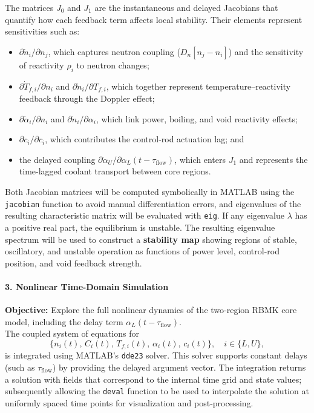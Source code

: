 \documentclass[11pt]{article}
\begin{document}
The matrices $J_0$ and $J_1$ are the instantaneous and delayed Jacobians that quantify how each feedback term affects local stability. Their elements represent sensitivities such as:
\begin{itemize}
    \item $\partial \dot{n}_i / \partial n_j$, which captures neutron coupling ($D_n[n_j - n_i]$) and the sensitivity of reactivity $\rho_i$ to neutron changes;
    \item $\partial \dot{T}_{f,i} / \partial n_i$ and $\partial \dot{n}_i / \partial T_{f,i}$, which together represent temperature--reactivity feedback through the Doppler effect;
    \item $\partial \dot{\alpha}_i / \partial n_i$ and $\partial \dot{n}_i / \partial \alpha_i$, which link power, boiling, and void reactivity effects;
    \item $\partial \dot{c}_i / \partial c_i$, which contributes the control-rod actuation lag; and
    \item the delayed coupling $\partial \dot{\alpha}_U / \partial \alpha_L(t-\tau_{\mathrm{flow}})$, which enters $J_1$ and represents the time-lagged coolant transport between core regions.
\end{itemize}

Both Jacobian matrices will be computed symbolically in MATLAB using the \texttt{jacobian} function to avoid manual differentiation errors, and eigenvalues of the resulting characteristic matrix will be evaluated with \texttt{eig}. If any eigenvalue $\lambda$ has a positive real part, the equilibrium is unstable. The resulting eigenvalue spectrum will be used to construct a \textbf{stability map} showing regions of stable, oscillatory, and unstable operation as functions of power level, control-rod position, and void feedback strength.

\paragraph{3. Nonlinear Time-Domain Simulation}
\textbf{Objective:} Explore the full nonlinear dynamics of the two-region RBMK core model, including the delay term \(\alpha_L(t - \tau_{\mathrm{flow}})\).\\

The coupled system of equations for 
\[
\{n_i(t),\,C_i(t),\,T_{f,i}(t),\,\alpha_i(t),\,c_i(t)\}, \quad i\in\{L,U\},
\]
is integrated using MATLAB’s \texttt{dde23} solver. This solver supports constant delays (such as \(\tau_{\mathrm{flow}}\)) by providing the delayed argument vector. The integration returns a solution with fields that correspond to the internal time grid and state values; subsequently allowing the \texttt{deval} function to be used to interpolate the solution at uniformly spaced time points for visualization and post-processing.\\
\end{document}
